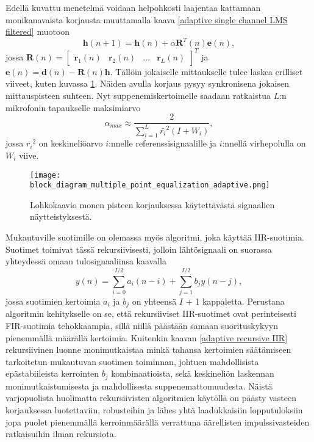 \documentclass[finnish,12pt]{article}
\begin{document}
Edellä kuvattu menetelmä voidaan helpohkosti laajentaa kattamaan monikanavaista korjausta muuttamalla kaava \eqref{adaptive single channel LMS filtered} muotoon \begin{equation}
\textbf{h}(n+1) = \textbf{h}(n) + \alpha \textbf{R}^T(n) \textbf{e}(n),
\end{equation} jossa 
\newline
$\textbf{R}(n) = \begin{bmatrix}
\textbf{r}_1(n) & \textbf{r}_2(n) & \hdots & \textbf{r}_L(n)
\end{bmatrix}^T$ ja
\newline
$\textbf{e}(n) = \textbf{d}(n) - \textbf{R}(n) \textbf{h}.$
\newline
Tällöin jokaiselle mittaukselle tulee laskea erilliset viiveet, kuten kuvassa \ref{fig:multiple adaptive filter block model}. Näiden avulla korjaus pysyy synkronisena jokaisen mittauspisteen suhteen. Nyt suppenemiskertoimelle saadaan ratkaistua $L$:n mikrofonin tapaukselle maksimiarvo \begin{equation}
\alpha_{max} \approx \frac{2}{\sum\limits_{i=1}^L \bar{r_i}^2 (I + W_i)},
\end{equation} jossa
\newline
$\bar{r_i}^2$ on keskineliöarvo $i$:nnelle referenssisignaalille ja
\newline
$i$:nnellä virhepolulla on $W_i$ viive. \cite{S.J.Elliot1989}

\begin{figure}[h!]
\centering
\texttt{[image: block\_diagram\_multiple\_point\_equalization\_adaptive.png]}
\caption{Lohkokaavio monen pisteen korjauksessa käytettävästä signaalien näytteistyksestä. \cite{S.J.Elliot1989}}
\label{fig:multiple adaptive filter block model}
\end{figure}

Mukautuville suotimille on olemassa myös algoritmi, joka käyttää IIR-suotimia. Suotimet toimivat tässä rekursiivisesti, jolloin lähtösignaali on suorassa yhteydessä omaan tulosignaaliinsa kaavalla \begin{equation} \label{adaptive recursive IIR}
y(n) = \sum\limits_{i=0}^{I/2} a_i (n-i) + \sum\limits_{j=1}^{I/2} b_j y(n-j), 
\end{equation} jossa suotimien kertoimia $a_i$ ja $b_j$ on yhteensä $I$ + 1 kappaletta. Perustana algoritmin kehitykselle on se, että rekursiiviset IIR-suotimet ovat perinteisesti FIR-suotimia tehokkaampia, sillä niillä päästään samaan suorituskykyyn pienemmällä määrällä kertoimia. Kuitenkin kaavan \eqref{adaptive recursive IIR} rekursiivinen luonne monimutkaistaa minkä tahansa kertoimien säätämiseen tarkoitetun mukautuvan suotimen toiminnan, johtuen mahdollisista epästabiileista kerrointen $b_j$ kombinaatioista, sekä keskineliön laskennan monimutkaistumisesta ja mahdollisesta suppenemattomuudesta. Näistä varjopuolista huolimatta rekursiivisten algoritmien käytöllä on päästy vasteen korjauksessa luotettaviin, robusteihin ja lähes yhtä laadukkaisiin lopputuloksiin jopa puolet pienemmällä kerroinmäärällä verrattuna äärellisten impulssivasteiden ratkaisuihin ilman rekursiota. \cite{S.J.Elliot1989}
\end{document}
